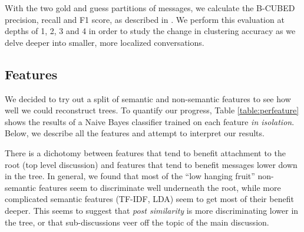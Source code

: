 \documentclass{article}
\begin{document}
With the two gold and guess partitions of messages, we calculate the B-CUBED
precision, recall and F1 score, as described in . We perform
this evaluation at depths of 1, 2, 3 and 4 in order to study the change in
clustering accuracy as we delve deeper into smaller, more localized
conversations.

\subsection{Features}
\label{sec:features}
We decided to try out a split of semantic and non-semantic features to see how
well we could reconstruct trees. To quantify our progress, Table
\ref{table:perfeature} shows the results of a Naive Bayes classifier trained on
each feature \textit{in isolation}. Below, we describe all the features and
attempt to interpret our results. 

There is a dichotomy between features that tend to benefit attachment to the
root (top level discussion) and features that tend to benefit messages lower
down in the tree. In general, we found that most of the ``low hanging fruit''
non-semantic features seem to discriminate well underneath the root, while
more complicated semantic features (TF-IDF, LDA) seem to get most of their
benefit deeper. This seems to suggest that \textit{post similarity} is more
discriminating lower in the tree, or that sub-discussions veer off the topic
of the main discussion.
\end{document}
